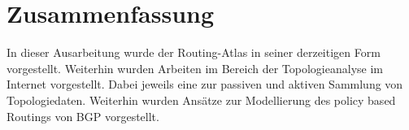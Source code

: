 \section{Zusammenfassung}\label{sec:schluss}

In dieser Ausarbeitung wurde der Routing-Atlas in seiner derzeitigen Form vorgestellt.
Weiterhin wurden Arbeiten im Bereich der Topologieanalyse im Internet vorgestellt.
Dabei jeweils eine zur passiven und aktiven Sammlung von Topologiedaten.
Weiterhin wurden Ansätze zur Modellierung des policy based Routings von BGP vorgestellt.
%
%
\newpage
